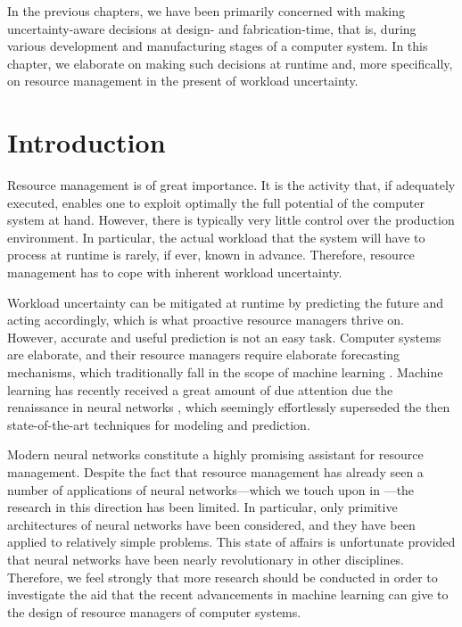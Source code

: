 In the previous chapters, we have been primarily concerned with making
uncertainty-aware decisions at design- and fabrication-time, that is, during
various development and manufacturing stages of a computer system. In this
chapter, we elaborate on making such decisions at runtime and, more
specifically, on resource management in the present of workload uncertainty.

\section{Introduction}

Resource management is of great importance. It is the activity that, if
adequately executed, enables one to exploit optimally the full potential of the
computer system at hand. However, there is typically very little control over
the production environment. In particular, the actual workload that the system
will have to process at runtime is rarely, if ever, known in advance. Therefore,
resource management has to cope with inherent workload uncertainty.

Workload uncertainty can be mitigated at runtime by predicting the future and
acting accordingly, which is what proactive resource managers thrive on.
However, accurate and useful prediction is not an easy task. Computer systems
are elaborate, and their resource managers require elaborate forecasting
mechanisms, which traditionally fall in the scope of machine learning
\cite{hastie2013}. Machine learning has recently received a great amount of due
attention due the renaissance in neural networks \cite{goodfellow2016}, which
seemingly effortlessly superseded the then state-of-the-art techniques for
modeling and prediction.

Modern neural networks constitute a highly promising assistant for resource
management. Despite the fact that resource management has already seen a number
of applications of neural networks---which we touch upon in
---the research in this direction has been limited. In
particular, only primitive architectures of neural networks have been
considered, and they have been applied to relatively simple problems. This state
of affairs is unfortunate provided that neural networks have been nearly
revolutionary in other disciplines. Therefore, we feel strongly that more
research should be conducted in order to investigate the aid that the recent
advancements in machine learning can give to the design of resource managers of
computer systems.

